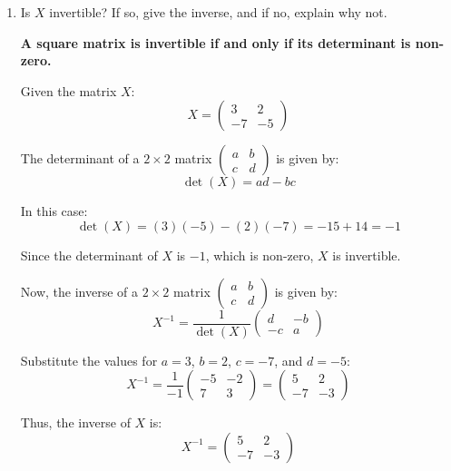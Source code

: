 \documentclass[letter]{article}
\theoremstyle{definition}
\newenvironment{soln}{
	\leavevmode\color{black}\ignorespaces
}{}
\begin{document}
\begin{enumerate}
		\item 	Is $X$ invertible? If so, give the inverse, and if no, explain why not.\\
		

        \begin{soln}
        \textbf{A square matrix is invertible if and only if its determinant is non-zero.}
        
        Given the matrix $X$:
        \[
        X = \begin{pmatrix} 3 & 2 \\ -7 & -5 \end{pmatrix}
        \]
        
        The determinant of a $2 \times 2$ matrix $\begin{pmatrix} a & b \\ c & d \end{pmatrix}$ is given by:
        \[
        \det(X) = ad - bc
        \]
        
        In this case:
        \[
        \det(X) = (3)(-5) - (2)(-7) = -15 + 14 = -1
        \]
        
        Since the determinant of $X$ is $-1$, which is non-zero, $X$ is invertible.
        
        Now, the inverse of a $2 \times 2$ matrix $\begin{pmatrix} a & b \\ c & d \end{pmatrix}$ is given by:
        \[
        X^{-1} = \frac{1}{\det(X)} \begin{pmatrix} d & -b \\ -c & a \end{pmatrix}
        \]
        
        Substitute the values for $a = 3$, $b = 2$, $c = -7$, and $d = -5$:
        \[
        X^{-1} = \frac{1}{-1} \begin{pmatrix} -5 & -2 \\ 7 & 3 \end{pmatrix} = \begin{pmatrix} 5 & 2 \\ -7 & -3 \end{pmatrix}
        \]
        
        Thus, the inverse of $X$ is:
        \[
        X^{-1} = \begin{pmatrix} 5 & 2 \\ -7 & -3 \end{pmatrix}
        \]
        \end{soln}

	\end{enumerate}
\end{document}
